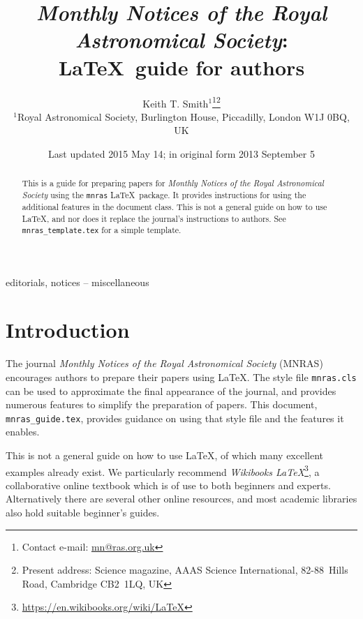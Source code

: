 \documentclass[a4paper,fleqn,usenatbib,useAMS]{mnras}
\title[MNRAS \LaTeX\ guide for authors]{\textit{Monthly Notices of the Royal Astronomical
  Society}: \\ \LaTeX\ guide for authors}
\author[K. T. Smith]{Keith T. Smith$^{1}$\thanks{Contact e-mail: \href{mailto:mn@ras.org.uk}{mn@ras.org.uk}}\thanks{Present address: Science magazine, AAAS Science International, \mbox{82-88}~Hills Road, Cambridge CB2~1LQ, UK}
\\
$^{1}$Royal Astronomical Society, Burlington House, Piccadilly, London W1J 0BQ, UK}
\date{Last updated 2015 May 14; in original form 2013 September 5}
\begin{document}
\label{firstpage}
\pagerange{\pageref{firstpage}--\pageref{lastpage}}
\maketitle

\begin{abstract}
This is a guide for preparing papers for \textit{Monthly Notices of the Royal Astronomical Society} using the \verb'mnras' \LaTeX\ package.
It provides instructions for using the additional features in the document class.
This is not a general guide on how to use \LaTeX, and nor does it replace the journal's instructions to authors.
See \texttt{mnras\_template.tex} for a simple template.
\end{abstract}

\begin{keywords}
editorials, notices -- miscellaneous
\end{keywords}



\begingroup
\let\clearpage\relax
\tableofcontents
\endgroup
\newpage

\section{Introduction}

The journal \textit{Monthly Notices of the Royal Astronomical Society} (MNRAS) encourages authors to prepare their papers using \LaTeX.
The style file \verb'mnras.cls' can be used to approximate the final appearance of the journal, and provides numerous features to simplify the preparation of papers.
This document, \verb'mnras_guide.tex', provides guidance on using that style file and the features it enables.

This is not a general guide on how to use \LaTeX, of which many excellent examples already exist.
We particularly recommend \textit{Wikibooks \LaTeX}\footnote{\url{https://en.wikibooks.org/wiki/LaTeX}}, a collaborative online textbook which is of use to both beginners and experts.
Alternatively there are several other online resources, and most academic libraries also hold suitable beginner's guides.
\end{document}
